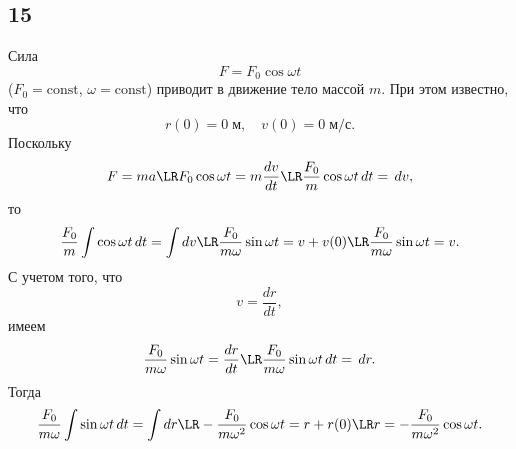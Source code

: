 \subsection{15}

Сила
\[
F=F_0\cos\omega t
\]
($F_0=\text{const}$, $\omega=\text{const}$) приводит в движение тело массой $m$. При этом известно, что
\[
r(0)=0\;\text{м},\quad v(0)=0\;\text{м/с}.
\]
Поскольку
\[
F=ma\LR F_0\cos\omega t=m\frac{dv}{dt}\LR \frac{F_0}{m}\cos\omega t\,dt=\,dv,
\]
то
\[
\frac{F_0}{m}\int\cos\omega t\,dt=\int dv\LR \frac{F_0}{m\omega}\sin\omega t=v+v(0)\LR \frac{F_0}{m\omega}\sin\omega t=v.
\]
С учетом того, что
\[
v=\frac{dr}{dt},
\]
имеем
\[
\frac{F_0}{m\omega}\sin\omega t=\frac{dr}{dt}\LR \frac{F_0}{m\omega}\sin\omega t\,dt=\,dr.
\]
Тогда
\[
\frac{F_0}{m\omega}\int\sin\omega t\,dt=\int dr \LR -\frac{F_0}{m\omega^2}\cos\omega t=r+r(0) \LR r=-\frac{F_0}{m\omega^2}\cos\omega t.
\]